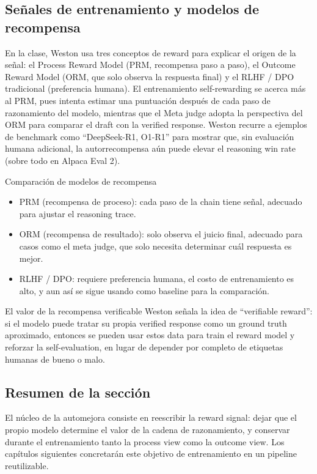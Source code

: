 \subsection{Señales de entrenamiento y modelos de recompensa}
En la clase, Weston usa tres conceptos de reward para explicar el origen de la señal: el Process Reward Model (PRM, recompensa paso a paso), el Outcome Reward Model (ORM, que solo observa la respuesta final) y el RLHF / DPO tradicional (preferencia humana). El entrenamiento self-rewarding se acerca más al PRM, pues intenta estimar una puntuación después de cada paso de razonamiento del modelo, mientras que el Meta judge adopta la perspectiva del ORM para comparar el draft con la verified response. Weston recurre a ejemplos de benchmark como ``DeepSeek-R1, O1-R1'' para mostrar que, sin evaluación humana adicional, la autorrecompensa aún puede elevar el reasoning win rate (sobre todo en Alpaca Eval 2).

\begin{importantbox}{Comparación de modelos de recompensa}
\begin{itemize}
    \item PRM (recompensa de proceso): cada paso de la chain tiene señal, adecuado para ajustar el reasoning trace.
    \item ORM (recompensa de resultado): solo observa el juicio final, adecuado para casos como el meta judge, que solo necesita determinar cuál respuesta es mejor.
    \item RLHF / DPO: requiere preferencia humana, el costo de entrenamiento es alto, y aun así se sigue usando como baseline para la comparación.
\end{itemize}
\end{importantbox}

\begin{knowledgebox}{El valor de la recompensa verificable}
Weston señala la idea de ``verifiable reward'': si el modelo puede tratar su propia verified response como un ground truth aproximado, entonces se pueden usar estos data para train el reward model y reforzar la self-evaluation, en lugar de depender por completo de etiquetas humanas de bueno o malo.
\end{knowledgebox}

\subsection{Resumen de la sección}
El núcleo de la automejora consiste en reescribir la reward signal: dejar que el propio modelo determine el valor de la cadena de razonamiento, y conservar durante el entrenamiento tanto la process view como la outcome view. Los capítulos siguientes concretarán este objetivo de entrenamiento en un pipeline reutilizable.

